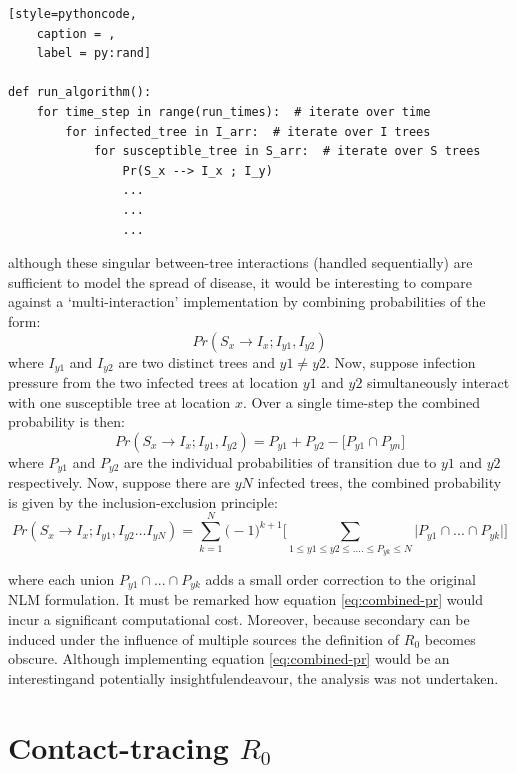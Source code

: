 \begin{lstlisting}[style=pythoncode,
    caption = ,
    label = py:rand]

def run_algorithm():
    for time_step in range(run_times):  # iterate over time
        for infected_tree in I_arr:  # iterate over I trees
            for susceptible_tree in S_arr:  # iterate over S trees
                Pr(S_x --> I_x ; I_y)
                ...
                ...
                ...
\end{lstlisting}

although these singular between-tree interactions (handled sequentially) are sufficient to model the spread of disease, it would be interesting to compare against a `multi-interaction' implementation by combining probabilities of the form:
\begin{equation}
    Pr(S_x \rightarrow I_{x}; I_{y1}, I_{y2})
\end{equation}
where $I_{y1}$ and $I_{y2}$ are two distinct trees and $y1 \neq y2$.
Now, suppose infection pressure from the two infected trees at location $y1$ and $y2$ simultaneously interact with one susceptible tree at location $x$.
Over a single time-step the combined probability is then:
\begin{equation}
    Pr(S_x \rightarrow I_{x}; I_{y1}, I_{y2}) = P_{y1} + P_{y2} - \big[ P_{y1} \cap P_{yn} \big] 
\end{equation}
where $P_{y1}$ and $P_{y2}$ are the individual probabilities of transition due to $y1$ and $y2$ respectively.
Now, suppose there are $yN$ infected trees, the combined probability is given by the inclusion-exclusion principle:
\begin{equation}
\label{eq:combined-pr}
     Pr(S_x \rightarrow I_{x}; I_{y1}, I_{y2}...I_{yN}) = \sum_{k=1}^{N} \big(  -1 \big)^{k+1} \Big[ \sum _{1\leq y1 \leq y2 \leq....\leq P_{yk} \leq N} \big| P_{y1}\cap ...\cap P_{yk}  \big|   \Big]
\end{equation}

where each union $P_{y1} \cap ... \cap P_{yk}$ adds a small order correction to the original NLM formulation.
It must be remarked how equation \ref{eq:combined-pr} would incur a significant computational cost.
Moreover, because secondary can be induced under the influence of multiple sources the definition of $R_0$ becomes obscure.  
Although implementing equation \ref{eq:combined-pr} would be an interesting\textemdash and potentially insightful\textemdash endeavour, the analysis was not undertaken.

\section{Contact-tracing $R_0$}
\label{A:R0-contact-traced-mortality}

